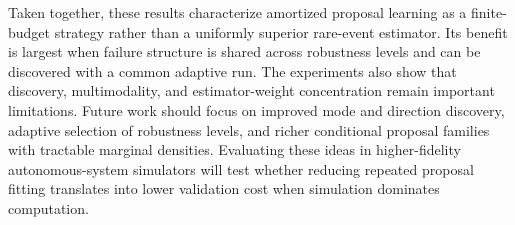 \documentclass[twoside,11pt]{article}
\begin{document}
Taken together, these results characterize amortized proposal learning as a finite-budget strategy rather than a uniformly superior rare-event estimator. Its benefit is largest when failure structure is shared across robustness levels and can be discovered with a common adaptive run. The experiments also show that discovery, multimodality, and estimator-weight concentration remain important limitations. Future work should focus on improved mode and direction discovery, adaptive selection of robustness levels, and richer conditional proposal families with tractable marginal densities. Evaluating these ideas in higher-fidelity autonomous-system simulators will test whether reducing repeated proposal fitting translates into lower validation cost when simulation dominates computation.



\vskip 0.2in


\newpage

\end{document}
